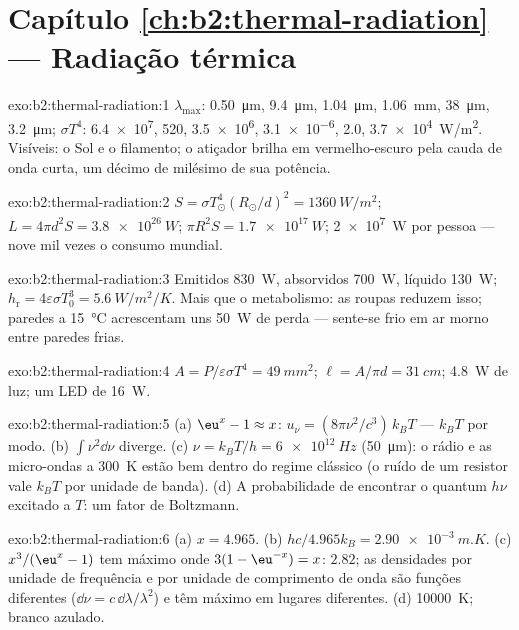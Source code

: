 \section*{Capítulo \ref{ch:b2:thermal-radiation} --- Radiação térmica}

\begin{solution}{exo:b2:thermal-radiation:1}
$\lambda_{\max}$: \qty{0.50}{\micro m}, \qty{9.4}{\micro m}, \qty{1.04}{\micro m},
\qty{1.06}{mm}, \qty{38}{\micro m}, \qty{3.2}{\micro m}; $\sigma T^4$: \qty{6.4e7}{},
\qty{520}{}, \qty{3.5e6}{}, \qty{3.1e-6}{}, \qty{2.0}{}, \qty{3.7e4}{W/m^2}. Visíveis:
o Sol e o filamento; o atiçador brilha em vermelho-escuro pela cauda de onda
curta, um décimo de milésimo de sua potência.
\end{solution}

\begin{solution}{exo:b2:thermal-radiation:2}
$S = \sigma T_\odot^4(R_\odot/d)^2 = \qty{1360}{W/m^2}$; $L = 4\pi d^2S =
\qty{3.8e26}{W}$; $\pi R^2S = \qty{1.7e17}{W}$; \qty{2e7}{W} por pessoa --- nove
mil vezes o consumo mundial.
\end{solution}

\begin{solution}{exo:b2:thermal-radiation:3}
Emitidos \qty{830}{W}, absorvidos \qty{700}{W}, líquido \qty{130}{W}; $h_{\text{r}} =
4\varepsilon\sigma T_0^3 = \qty{5.6}{W/m^2/K}$. Mais que o metabolismo:
as roupas reduzem isso; paredes a \qty{15}{\celsius} acrescentam uns \qty{50}{W} de perda
--- sente-se frio em ar morno entre paredes frias.
\end{solution}

\begin{solution}{exo:b2:thermal-radiation:4}
$A = P/\varepsilon\sigma T^4 = \qty{49}{mm^2}$; $\ell = A/\pi d = \qty{31}{cm}$;
\qty{4.8}{W} de luz; um LED de \qty{16}{W}.
\end{solution}

\begin{solution}{exo:b2:thermal-radiation:5}
(a) $\eu^x - 1 \approx x$: $u_\nu = (8\pi\nu^2/c^3)\,k_BT$ --- $k_BT$ por modo.
(b) $\int\nu^2\dd\nu$ diverge. (c) $\nu = k_BT/h = \qty{6e12}{Hz}$ (\qty{50}{\micro m}):
o rádio e as micro-ondas a \qty{300}{K} estão bem dentro do regime clássico (o
ruído de um resistor vale $k_BT$ por unidade de banda). (d) A probabilidade de
encontrar o quantum $h\nu$ excitado a $T$: um fator de Boltzmann.
\end{solution}

\begin{solution}{exo:b2:thermal-radiation:6}
(a) $x = 4.965$. (b) $hc/4.965k_B = \qty{2.90e-3}{m.K}$. (c) $x^3/(\eu^x - 1)$
tem máximo onde $3(1 - \eu^{-x}) = x$: $2.82$; as densidades por unidade de frequência
e por unidade de comprimento de onda são funções diferentes ($\dd\nu = c\,\dd\lambda/\lambda^2$)
e têm máximo em lugares diferentes. (d) \qty{10000}{K}; branco azulado.
\end{solution}

